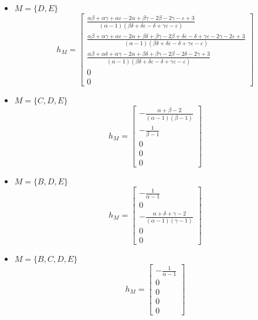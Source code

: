 \begin{itemize}
    \item $M = \{D,E\}$
    \[ 
        h_M = \left[\begin{matrix}
            \frac{\alpha \beta + \alpha \gamma + \alpha \varepsilon - 2 \alpha + \beta \gamma - 2 \beta - 2 \gamma - \varepsilon + 3}{\left(\alpha - 1\right) \left(\beta \delta + \delta \varepsilon - \delta + \gamma \varepsilon - \varepsilon\right)}\\
            \frac{\alpha \beta + \alpha \gamma + \alpha \varepsilon - 2 \alpha + \beta \delta + \beta \gamma - 2 \beta + \delta \varepsilon - \delta + \gamma \varepsilon - 2 \gamma - 2 \varepsilon + 3}{\left(\alpha - 1\right) \left(\beta \delta + \delta \varepsilon - \delta + \gamma \varepsilon - \varepsilon\right)}\\
            \frac{\alpha \beta + \alpha \delta + \alpha \gamma - 2 \alpha + \beta \delta + \beta \gamma - 2 \beta - 2 \delta - 2 \gamma + 3}{\left(\alpha - 1\right) \left(\beta \delta + \delta \varepsilon - \delta + \gamma \varepsilon - \varepsilon\right)}\\
            0\\
            0
        \end{matrix}\right]
    \]
    \item $M = \{C,D,E\}$
    \[ h_M = \left[\begin{matrix}- \frac{\alpha + \beta - 2}{\left(\alpha - 1\right) \left(\beta - 1\right)}\\- \frac{1}{\beta - 1}\\0\\0\\0\end{matrix}\right]
    \]
    \item $M = \{B,D,E\}$
    \[ h_M = \left[\begin{matrix}- \frac{1}{\alpha - 1}\\0\\- \frac{\alpha + \delta + \gamma - 2}{\left(\alpha - 1\right) \left(\gamma - 1\right)}\\0\\0\end{matrix}\right]
    \]
    \item $M = \{B,C,D,E\}$
    \[ h_M = \left[\begin{matrix}- \frac{1}{\alpha - 1}\\0\\0\\0\\0\end{matrix}\right]
\]
\end{itemize}
